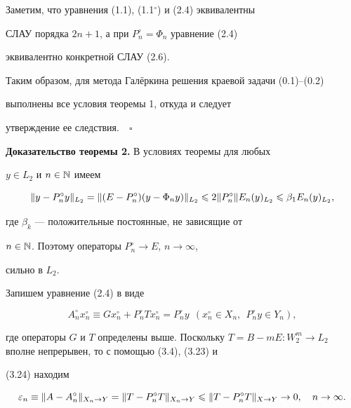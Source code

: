 Заметим, что уравнения (1.1), (1.1$^\circ$) и (2.4) эквивалентны


СЛАУ порядка $2n+1$, а при $P_n^\circ=\Phi_n$ уравнение (2.4)


эквивалентно конкретной СЛАУ (2.6).





Таким образом, для метода Гал\"еркина решения краевой задачи (0.1)--(0.2) 


выполнены все условия теоремы 1, откуда и следует


утверждение ее следствия.$\quad\square$


\medskip





{\bf Доказательство теоремы 2.} В условиях теоремы для любых


$y\in L_2$ и $n\in\Bbb {N}$ имеем


\begin{equation}


\|y - P_n^\circ y\|_{L_2} = \|(E-P_n^\circ)(y-\Phi_n y)\|_{L_2}


\lea 2 \|P_n^\circ \|E_n(y)_{L_2}\lea \beta_1 E_n(y)_{L_2},


\end{equation}


где $\beta_k$ --- положительные постоянные, не зависящие от


$n\in\Bbb {N}$. Поэтому операторы $P_n^\circ\to E$, $n\to \infty$,


сильно в $L_2$.





Запишем уравнение (2.4) в виде


\begin{equation}


A_n^\circ x_n^\circ \equiv Gx^\circ_n + P_n^\circ T x_n^\circ =


P_n^\circ y \ \ (x_n^\circ \in X_n,\ \ P_n^\circ y\in Y_n),


\end{equation}


где операторы $G$ и $T$ определены выше. Поскольку $T = B -


mE:W_2^m\to L_2$ вполне непрерывен, то с помощью (3.4), (3.23) и


(3.24) находим


\begin{equation}


\ve_n \equiv \|A - A_n^\circ\|_{X_n\to Y} = \|T - P_n^\circ


T\|_{X_n\to Y}\lea \|T - P_n^\circ T\|_{X\to Y}\to 0,\quad n\to


\infty.


\end{equation}



